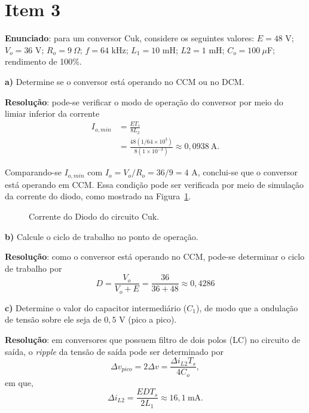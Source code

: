\section*{Item 3}\label{it:3}

\textbf{Enunciado}: para um conversor Cuk, considere os seguintes valores: $E = 48$ V; $V_o = 36$ V; $R_o = 9~\Omega$; $f = 64$ kHz; $L_1 = 10$ mH; $L2 = 1$ mH; $C_o = 100~\mu$F; rendimento de 100\%.

\medskip
\textbf{a)} Determine se o conversor está operando no CCM ou no DCM.

\medskip
\textbf{Resolução}: pode-se verificar o modo de operação do conversor por meio do limiar inferior da corrente~\cite{aula3.3}
\begin{equation*}
	\begin{aligned}
		I_{o,min} &= \frac{ET_s}{8L_2} \\
		&= \frac{48(1/64\times 10^3)}{8(1 \times 10^{-3})} \approx 0{,}0938~\mathrm{A}.
	\end{aligned}
\end{equation*}

Comparando-se $I_{o,min}$ com $I_{o} = V_o/R_o = 36/9 = 4$ A, conclui-se que o conversor está operando em CCM. Essa condição pode ser verificada por meio de simulação da corrente do diodo, como mostrado na Figura~\ref{fig:ex3_1}.
\begin{figure}[htb!]
	\centering
	
	\caption{Corrente do Diodo do circuito Cuk.}
	\label{fig:ex3_1}
\end{figure}

\medskip
\textbf{b)} Calcule o ciclo de trabalho no ponto de operação.

\medskip
\textbf{Resolução}: como o conversor está operando no CCM, pode-se determinar o ciclo de trabalho por~\cite{Eri:20}
\begin{equation*}
	D = \frac{V_o}{V_o + E} = \frac{36}{36 + 48} \approx 0{,}4286
\end{equation*}

\medskip
\textbf{c)} Determine o valor do capacitor intermediário ($C_1$), de modo que a ondulação de tensão sobre ele seja de $0{,}5$ V (pico a pico).

\medskip
\textbf{Resolução}: em conversores que possuem filtro de dois polos (LC) no circuito de saída, o \textit{ripple} da tensão de saída pode ser determinado por~\cite{Eri:20}
\begin{equation}\label{eq:ex3_1}
	\Delta v_{pico} = 2\Delta v = \frac{\Delta i_{L2}T_s}{4C_o},
\end{equation}
em que,
\begin{equation*}
	\Delta i_{L2} = \frac{EDT_s}{2L_1} \approx 16{,}1~\mathrm{mA}.
\end{equation*}

